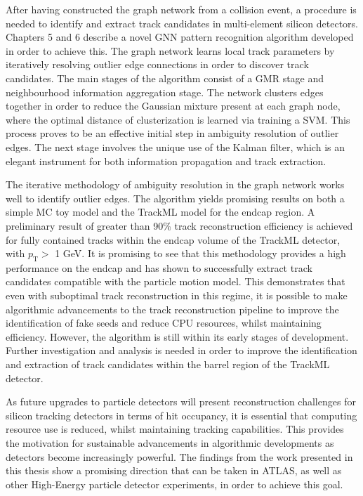 After having constructed the graph network from a collision event, a procedure is needed to identify and extract track candidates in multi-element silicon detectors. Chapters 5 and 6 describe a novel GNN pattern recognition algorithm developed in order to achieve this. The graph network learns local track parameters by iteratively resolving outlier edge connections in order to discover track candidates. The main stages of the algorithm consist of a GMR stage and neighbourhood information aggregation stage. The network clusters edges together in order to reduce the Gaussian mixture present at each graph node, where the optimal distance of clusterization is learned via training a SVM. This process proves to be an effective initial step in ambiguity resolution of outlier edges. The next stage involves the unique use of the Kalman filter, which is an elegant instrument for both information propagation and track extraction. 

The iterative methodology of ambiguity resolution in the graph network works well to identify outlier edges. The algorithm yields promising results on both a simple MC toy model and the TrackML model for the endcap region. A preliminary result of greater than 90\% track reconstruction efficiency is achieved for fully contained tracks within the endcap volume of the TrackML detector, with $p_{\text{T}} >$ 1 GeV. It is promising to see that this methodology provides a high performance on the endcap and has shown to successfully extract track candidates compatible with the particle motion model. This demonstrates that even with suboptimal track reconstruction in this regime, it is possible to make algorithmic advancements to the track reconstruction pipeline to improve the identification of fake seeds and reduce CPU resources, whilst maintaining efficiency. However, the algorithm is still within its early stages of development. Further investigation and analysis is needed in order to improve the identification and extraction of track candidates within the barrel region of the TrackML detector.


As future upgrades to particle detectors will present reconstruction challenges for silicon tracking detectors in terms of hit occupancy, it is essential that computing resource use is reduced, whilst maintaining tracking capabilities. This provides the motivation for sustainable advancements in algorithmic developments as detectors become increasingly powerful. The findings from the work presented in this thesis show a promising direction that can be taken in ATLAS, as well as other High-Energy particle detector experiments, in order to achieve this goal. 
